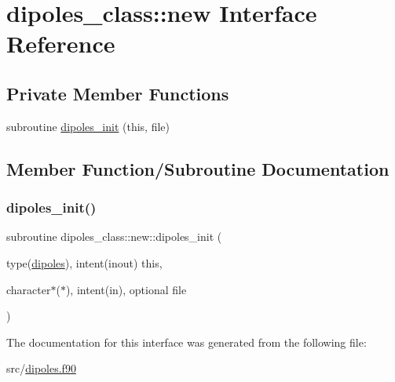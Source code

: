 \hypertarget{interfacedipoles__class_1_1new}{}\section{dipoles\+\_\+class\+:\+:new Interface Reference}
\label{interfacedipoles__class_1_1new}
\subsection*{Private Member Functions}
\begin{DoxyCompactItemize}
\item 
subroutine \hyperlink{interfacedipoles__class_1_1new_a81deca9b8284c62ebddc958baa27128d}{dipoles\+\_\+init} (this, file)
\end{DoxyCompactItemize}


\subsection{Member Function/\+Subroutine Documentation}
\mbox{\label{interfacedipoles__class_1_1new_a81deca9b8284c62ebddc958baa27128d}} 
\subsubsection{\texorpdfstring{dipoles\+\_\+init()}{dipoles\_init()}}
{\footnotesize\ttfamily subroutine dipoles\+\_\+class\+::new\+::dipoles\+\_\+init (\begin{DoxyParamCaption}\item[{type(\hyperlink{structdipoles__class_1_1dipoles}{dipoles}), intent(inout)}]{this,  }\item[{character$\ast$($\ast$), intent(in), optional}]{file }\end{DoxyParamCaption})\hspace{0.3cm}{\ttfamily [private]}}



The documentation for this interface was generated from the following file\+:\begin{DoxyCompactItemize}
\item 
src/\hyperlink{dipoles_8f90}{dipoles.\+f90}\end{DoxyCompactItemize}
